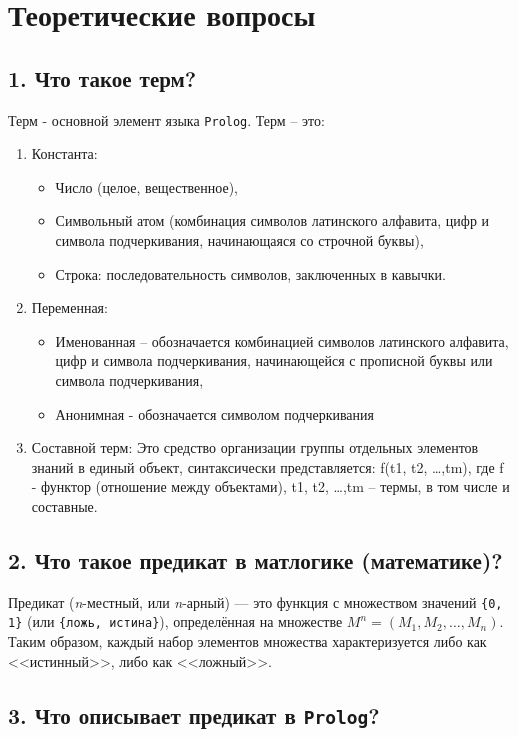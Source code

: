 \section*{Теоретические вопросы}

\subsection*{1. Что такое терм?}

Терм - основной элемент языка \texttt{Prolog}. Терм – это:
\begin{enumerate}
	\item Константа: 
	\begin{itemize}
		\item Число (целое, вещественное),
		\item Символьный атом (комбинация символов латинского алфавита, цифр и символа подчеркивания, начинающаяся со строчной буквы),
		\item Строка: последовательность символов, заключенных в кавычки.
	\end{itemize}
	\item Переменная:
	\begin{itemize}
		\item Именованная – обозначается комбинацией символов латинского алфавита, цифр и символа подчеркивания, начинающейся с прописной буквы или символа подчеркивания,
		\item Анонимная  - обозначается символом подчеркивания
	\end{itemize}
	\item Составной терм:
	Это средство организации группы отдельных элементов знаний в единый  объект,  синтаксически представляется: f(t1, t2, …,tm), где f -  функтор (отношение между объектами), t1, t2, …,tm – термы, в том  числе  и составные.
\end{enumerate}

\subsection*{2. Что такое предикат в матлогике (математике)?}

Предикат (\textit{n}-местный, или \textit{n}-арный) --- это функция с множеством значений \texttt{\{0, 1\}} (или \texttt{\{ложь, истина\}}), определённая на множестве $M^n = (M_1, M_2, \ldots, M_n)$. Таким образом, каждый набор элементов множества характеризуется либо как <<истинный>>, либо как <<ложный>>.

\subsection*{3. Что описывает предикат в \texttt{Prolog}?}

